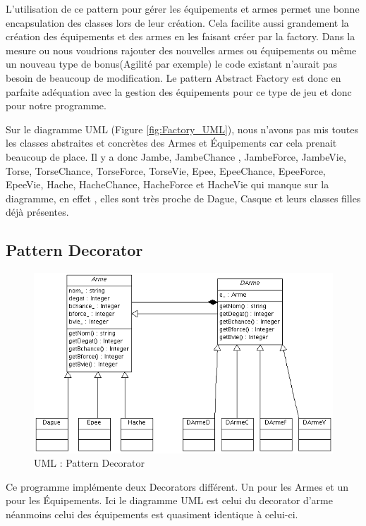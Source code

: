 \documentclass[a4paper]{article}
\begin{document}
L'utilisation de ce pattern pour gérer les équipements et armes permet une bonne encapsulation des classes lors de leur création.
Cela facilite aussi grandement la création des équipements et des armes en les faisant créer par la factory.
Dans la mesure ou nous voudrions rajouter des nouvelles armes ou équipements ou même un nouveau type de bonus(Agilité par exemple) le code existant n'aurait pas besoin de beaucoup de modification.
Le pattern Abstract Factory est donc en parfaite adéquation avec la gestion des équipements pour ce type de jeu et donc pour notre programme.

Sur le diagramme UML (Figure \ref{fig:Factory_UML}), nous n'avons pas mis toutes les classes abstraites et concrètes des Armes et Équipements car cela prenait beaucoup de place.
Il y a donc Jambe, JambeChance , JambeForce, JambeVie, Torse, TorseChance, TorseForce, TorseVie, Epee, EpeeChance, EpeeForce, EpeeVie, Hache, HacheChance, HacheForce et HacheVie qui manque sur la diagramme, en effet , elles sont très proche de Dague, Casque et leurs classes filles déjà présentes.


  \subsection{Pattern Decorator}
    \begin{figure}[h]
      \centering
      \includegraphics[width=15cm]{./Decorator_UML.png}
      \caption{\label{fig:Decorator_UML} UML : Pattern Decorator}
    \end{figure}

Ce programme implémente deux Decorators différent. Un pour les Armes et un pour les Équipements. Ici le diagramme UML est celui du decorator d'arme néanmoins celui des équipements est quasiment identique à celui-ci.
\end{document}
